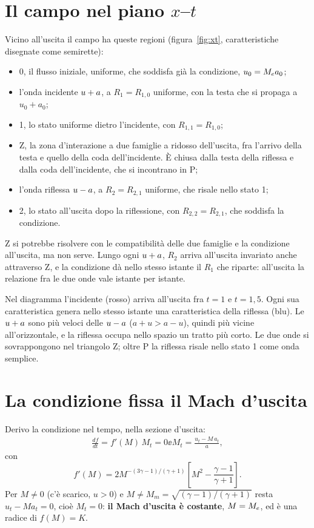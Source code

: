 \section*{Il campo nel piano $x$--$t$}
Vicino all'uscita il campo ha queste regioni (figura~\ref{fig:xt}, caratteristiche disegnate come semirette):
\begin{itemize}
  \item 0, il flusso iniziale, uniforme, che soddisfa già la condizione, $u_0=M_e a_0$;
  \item l'onda incidente $u+a$, a $R_1=R_{1,0}$ uniforme, con la testa che si propaga a $u_0+a_0$;
  \item 1, lo stato uniforme dietro l'incidente, con $R_{1,1}=R_{1,0}$;
  \item Z, la zona d'interazione a due famiglie a ridosso dell'uscita, fra l'arrivo della testa e quello della coda
        dell'incidente. È chiusa dalla testa della riflessa e dalla coda dell'incidente, che si incontrano in P;
  \item l'onda riflessa $u-a$, a $R_2=R_{2,1}$ uniforme, che risale nello stato 1;
  \item 2, lo stato all'uscita dopo la riflessione, con $R_{2,2}=R_{2,1}$, che soddisfa la condizione.
\end{itemize}
Z si potrebbe risolvere con le compatibilità delle due famiglie e la condizione all'uscita, ma non serve. Lungo ogni
$u+a$, $R_2$ arriva all'uscita invariato anche attraverso Z, e la condizione dà nello stesso istante il $R_1$ che
riparte: all'uscita la relazione fra le due onde vale istante per istante.


Nel diagramma l'incidente (rosso) arriva all'uscita fra $t=1$ e $t=1{,}5$. Ogni sua caratteristica genera nello
stesso istante una caratteristica della riflessa (blu). Le $u+a$ sono più veloci delle $u-a$ ($a+u>a-u$), quindi più
vicine all'orizzontale, e la riflessa occupa nello spazio un tratto più corto. Le due onde si sovrappongono nel
triangolo Z; oltre P la riflessa risale nello stato 1 come onda semplice.

\section*{La condizione fissa il Mach d'uscita}
Derivo la condizione nel tempo, nella sezione d'uscita:
\begin{gather*}
  \frac{df}{dt}=f'(M)\,M_t=0 \ee M_t=\frac{u_t-M\,a_t}{a},
\end{gather*}
con
\[
  f'(M)=2M^{-(3\gamma-1)/(\gamma+1)}\left[M^2-\frac{\gamma-1}{\gamma+1}\right].
\]
Per $M\neq0$ (c'è scarico, $u>0$) e $M\neq M_m=\sqrt{(\gamma-1)/(\gamma+1)}$ resta $u_t-M a_t=0$, cioè $M_t=0$:
\textbf{il Mach d'uscita è costante}, $M=M_e$, ed è una radice di $f(M)=K$.

